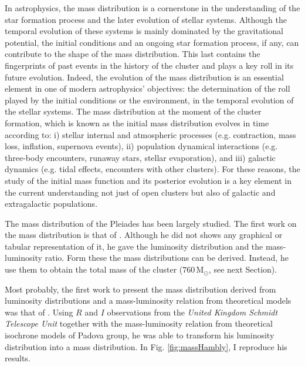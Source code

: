 In astrophysics, the mass distribution is a cornerstone in the understanding of the star formation process and the later evolution of stellar systems. Although the temporal evolution of these systems is mainly dominated by the gravitational potential, the initial conditions and an ongoing star formation process, if any, can contribute to the shape of the mass distribution. This last contains the fingerprints of past events in the history of the cluster and plays a key roll in its future evolution. Indeed, the evolution of the mass distribution is an essential element in one of modern astrophysics' objectives: the determination of the roll played by the initial conditions or the environment, in the temporal evolution of the stellar systems. The mass distribution at the moment of the cluster formation, which is known as the initial mass distribution evolves in time according to: i) stellar internal and atmospheric processes (e.g. contraction, mass loss, inflation, supernova events), ii) population dynamical interactions (e.g. three-body encounters, runaway stars, stellar evaporation), and iii) galactic dynamics (e.g. tidal effects, encounters with other clusters). For these reasons, the study of the initial mass function and its posterior evolution is a key element in the current understanding not just of open clusters but also of galactic and extragalactic populations.  


The mass distribution of the Pleiades has been largely studied. The first work on the mass distribution is that of \citet{Limber1962}. Although he did not shows any graphical or tabular representation of it, he gave the luminosity distribution and the mass-luminosity ratio. Form these the mass distributions can be derived. Instead, he use them to obtain the total mass of the cluster ($760\,\mathrm{M_{\odot}}$, see next Section). 

Most probably, the first work to present the mass distribution derived from luminosity distributions and a mass-luminosity relation from theoretical models was that of \citet{Hambly1991}. Using $R$ and $I$ observations from the \emph{United Kingdom Schmidt Telescope Unit} together with the mass-luminosity relation from theoretical isochrone models of Padova group, he was able to transform his luminosity distribution into a mass distribution. In Fig. \ref{fig:massHambly}, I reproduce his results. 

